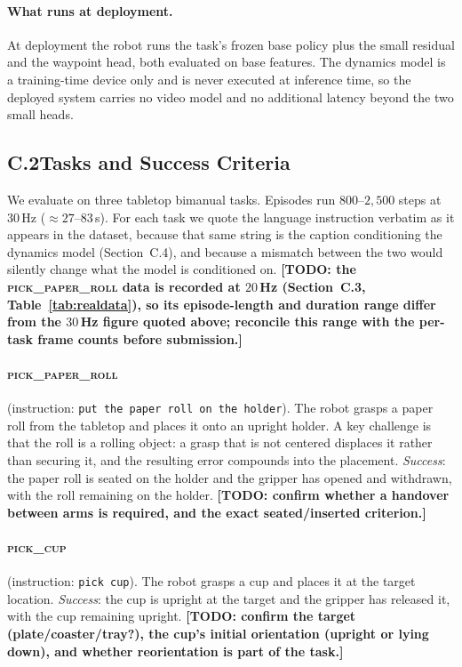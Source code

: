 \documentclass[letterpaper]{article} %
\newcommand{\todo}[1]{\textbf{[TODO: #1]}}
\begin{document}
\paragraph{What runs at deployment.}
At deployment the robot runs the task's frozen base policy plus the small
residual and the waypoint head, both evaluated on base features. The dynamics
model is a training-time device only and is never executed at inference time, so
the deployed system carries no video model and no additional latency beyond the
two small heads.

\subsection{C.2\quad Tasks and Success Criteria}

We evaluate on three tabletop bimanual tasks. Episodes run $800$--$2{,}500$ steps
at $30$\,Hz ($\approx 27$--$83$\,s). For each task we quote the language
instruction verbatim as it appears in the dataset, because that same string is
the caption conditioning the dynamics model (Section~C.4), and because a mismatch
between the two would silently change what the model is conditioned on.
\todo{the \textsc{pick\_paper\_roll} data is recorded at $20$\,Hz (Section~C.3,
Table~\ref{tab:realdata}), so its episode-length and duration range differ from
the $30$\,Hz figure quoted above; reconcile this range with the per-task frame
counts before submission.}

\paragraph{\textsc{pick\_paper\_roll}} (instruction: \texttt{put the paper roll on
the holder}). The robot grasps a paper roll from the tabletop and places it onto
an upright holder. A key challenge is that the roll is a rolling object: a grasp
that is not centered displaces it rather than securing it, and the resulting
error compounds into the placement. \emph{Success}: the paper roll is seated on
the holder and the gripper has opened and withdrawn, with the roll remaining on
the holder. \todo{confirm whether a handover between arms is required, and the
exact seated/inserted criterion.}

\paragraph{\textsc{pick\_cup}} (instruction: \texttt{pick cup}). The robot grasps
a cup and places it at the target location. \emph{Success}: the cup is upright at
the target and the gripper has released it, with the cup remaining upright.
\todo{confirm the target (plate/coaster/tray?), the cup's initial orientation
(upright or lying down), and whether reorientation is part of the task.}
\end{document}
